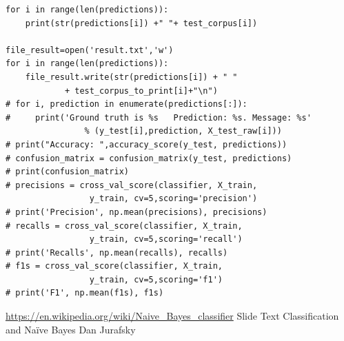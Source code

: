 \documentclass[a4paper,11pt]{report}
\begin{document}
\begin{lstlisting}
for i in range(len(predictions)):
    print(str(predictions[i]) +" "+ test_corpus[i])

file_result=open('result.txt','w')
for i in range(len(predictions)):
    file_result.write(str(predictions[i]) + " "
    		+ test_corpus_to_print[i]+"\n")
# for i, prediction in enumerate(predictions[:]):
#     print('Ground truth is %s   Prediction: %s. Message: %s' 
				% (y_test[i],prediction, X_test_raw[i]))
# print("Accuracy: ",accuracy_score(y_test, predictions))
# confusion_matrix = confusion_matrix(y_test, predictions)
# print(confusion_matrix)
# precisions = cross_val_score(classifier, X_train,
                 y_train, cv=5,scoring='precision')
# print('Precision', np.mean(precisions), precisions)
# recalls = cross_val_score(classifier, X_train,
                 y_train, cv=5,scoring='recall')
# print('Recalls', np.mean(recalls), recalls)
# f1s = cross_val_score(classifier, X_train,
                 y_train, cv=5,scoring='f1')
# print('F1', np.mean(f1s), f1s)
\end{lstlisting}
\begin{thebibliography}{5}
\url{https://en.wikipedia.org/wiki/Naive_Bayes_classifier}
Slide Text Classification and Naïve Bayes Dan	Jurafsky	
\end{thebibliography}
\end{document}
